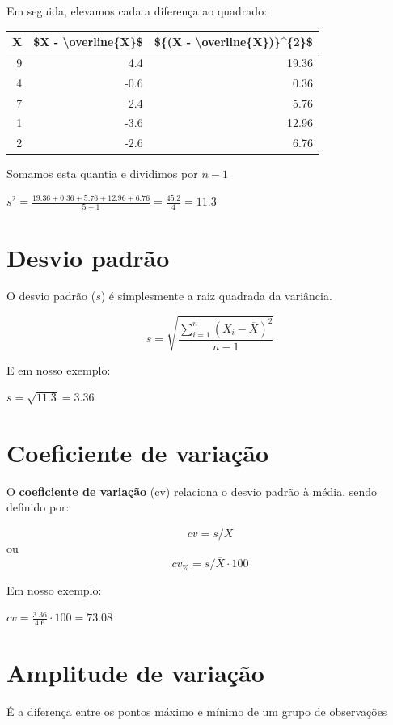 \documentclass[
]{book}
\begin{document}
Em seguida, elevamos cada a diferença ao quadrado:

\begin{tabular}{r|r|r}
\hline
X & \$X - \textbackslash{}overline\{X\}\$ & \$\{(X - \textbackslash{}overline\{X\})\}\textasciicircum{}\{2\}\$\\
\hline
9 & 4.4 & 19.36\\
\hline
4 & -0.6 & 0.36\\
\hline
7 & 2.4 & 5.76\\
\hline
1 & -3.6 & 12.96\\
\hline
2 & -2.6 & 6.76\\
\hline
\end{tabular}

Somamos esta quantia e dividimos por \(n - 1\)

\(s^2 = \frac{19.36 + 0.36 + 5.76 + 12.96 + 6.76}{5 - 1} = \frac{45.2}{4} = 11.3\)

\hypertarget{desvio-padruxe3o}{%
\section{Desvio padrão}\label{desvio-padruxe3o}}

O desvio padrão (\(s\)) é simplesmente a raiz quadrada da variância.

\[s=\sqrt{\frac{\sum_{i=1}^n{(X_i - \overline{X})^2}}{n-1}}\]

E em nosso exemplo:

\(s = \sqrt{11.3} = 3.36\)

\hypertarget{coeficiente-de-variauxe7uxe3o}{%
\section{Coeficiente de variação}\label{coeficiente-de-variauxe7uxe3o}}

O \textbf{coeficiente de variação} (cv) relaciona o desvio padrão à média, sendo definido por:

\[cv = s/\overline{X}\] ou \[cv_{\%}  = s/\overline{X}\cdot 100\]

Em nosso exemplo:

\(cv = \frac{3.36}{4.6} \cdot 100 = 73.08\)

\hypertarget{amplitude-de-variauxe7uxe3o}{%
\section{Amplitude de variação}\label{amplitude-de-variauxe7uxe3o}}

É a diferença entre os pontos máximo e mínimo de um grupo de observações
\end{document}
